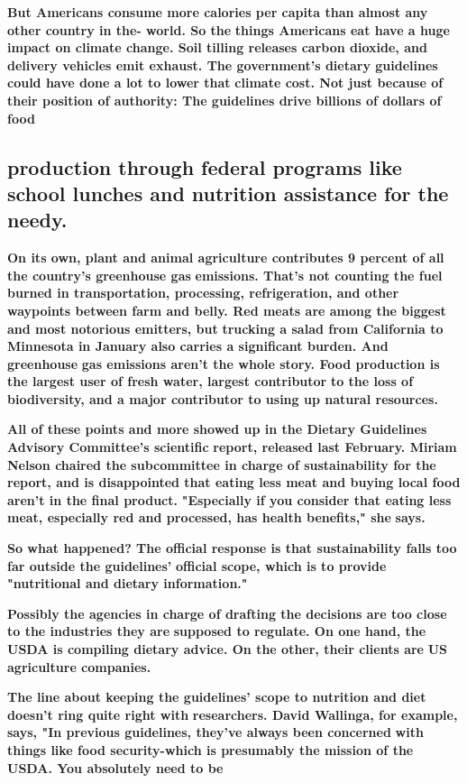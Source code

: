 \documentclass[UTF8,11pt]{ctexart}
\begin{document}
\textbf{But Americans consume more calories per capita than almost any other country in the- world. So the} \textbf{things Americans eat have a huge impact on climate change. Soil tilling releases carbon dioxide, and} \textbf{delivery vehicles emit exhaust. The government's dietary guidelines could have done a lot to lower that} \textbf{climate cost. Not just because of their position of authority: The guidelines drive billions of dollars of food}


\subsection*{\textbf{production through federal programs like school lunches and nutrition assistance for the needy.}}


\textbf{On its own, plant and animal agriculture contributes 9 percent of all the country's greenhouse gas} \textbf{emissions. That's not counting the fuel burned in transportation, processing, refrigeration, and other} \textbf{waypoints between farm and belly. Red meats are among the biggest and most notorious emitters, but} \textbf{trucking a salad from California to Minnesota in January also carries a significant burden. And greenhouse} \textbf{gas emissions aren't the whole story. Food production is the largest user of fresh water, largest contributor} \textbf{to the loss of biodiversity, and a major contributor to using up natural resources.}


\textbf{All of these points and more showed up in the Dietary Guidelines Advisory Committee's scientific} \textbf{report, released last February. Miriam Nelson chaired the subcommittee in charge of sustainability for the} \textbf{report, and is disappointed that eating less meat and buying local food aren't in the final product.} \textbf{"Especially if you consider that eating less meat, especially red and processed, has health benefits," she} \textbf{says.}


\textbf{So what happened? The official response is that sustainability falls too far outside the guidelines'} \textbf{official scope, which is to provide "nutritional and dietary information."}


\textbf{Possibly the agencies in charge of drafting the decisions are too close to the industries they are} \textbf{supposed to regulate. On one hand, the USDA is compiling dietary advice. On the other, their clients are} \textbf{US agriculture companies.}


\textbf{The line about keeping the guidelines' scope to nutrition and diet doesn't ring quite right with} \textbf{researchers. David Wallinga, for example, says, "In previous guidelines, they've always been concerned} \textbf{with things like food security-which is presumably the mission of the USDA. You absolutely need to be}
\end{document}
